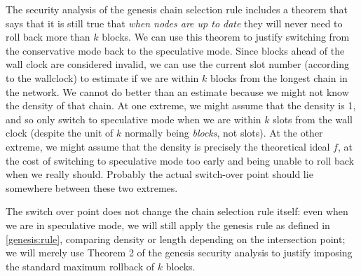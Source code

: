 The security analysis of the genesis chain selection rule includes a theorem
\cite[Theorem 2]{cryptoeprint:2018:378} that says that it is still true that
\emph{when nodes are up to date} they will never need to roll back more than $k$
blocks. We can use this theorem to justify switching from the conservative
mode back to the speculative mode. Since blocks ahead of the wall clock are
considered invalid, we can use the current slot number (according to the
wallclock) to estimate if we are within $k$ blocks from the longest chain
in the network. We cannot do better than an estimate because we might not know
the density of that chain. At one extreme, we might assume that the density is
1, and so only switch to speculative mode when we are within $k$ slots from the
wall clock (despite the unit of $k$ normally being \emph{blocks}, not slots). At
the other extreme, we might assume that the density is precisely the theoretical
ideal $f$, at the cost of switching to speculative mode too early and being
unable to roll back when we really should. Probably the actual switch-over point
should lie somewhere between these two extremes.

The switch over point does not change the chain selection rule itself: even when
we are in speculative mode, we will still apply the genesis rule as defined in
\cref{genesis:rule}, comparing density or length depending on the intersection
point; we will merely use Theorem 2 of the genesis security analysis to justify
imposing the standard maximum rollback of $k$ blocks.

